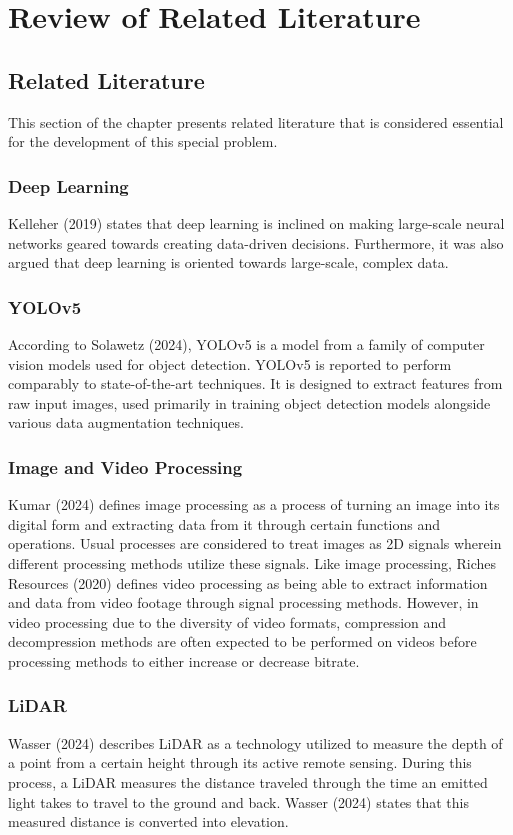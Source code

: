 \documentclass{report} %
\begin{document}
	
	\chapter{Review of Related Literature}
	
	\section{Related Literature}
	This section of the chapter presents related literature that is considered essential for the development of this special problem.
	
	\subsection{Deep Learning}
	Kelleher (2019) states that deep learning is inclined on making large-scale neural networks geared towards creating data-driven decisions. Furthermore, it was also argued that deep learning is oriented towards large-scale, complex data.
	
	\subsection{YOLOv5}
	According to Solawetz (2024), YOLOv5 is a model from a family of computer vision models used for object detection. YOLOv5 is reported to perform comparably to state-of-the-art techniques. It is designed to extract features from raw input images, used primarily in training object detection models alongside various data augmentation techniques.
	
	\subsection{Image and Video Processing}
	Kumar (2024) defines image processing as a process of turning an image into its digital form and extracting data from it through certain functions and operations. Usual processes are considered to treat images as 2D signals wherein different processing methods utilize these signals.
	Like image processing, Riches Resources (2020) defines video processing as being able to extract information and data from video footage through signal processing methods. However, in video processing due to the diversity of video formats, compression and decompression methods are often expected to be performed on videos before processing methods to either increase or decrease bitrate.
	
	\subsection{LiDAR}
	Wasser (2024) describes LiDAR as a technology utilized to measure the depth of a point from a certain height through its active remote sensing. During this process, a LiDAR measures the distance traveled through the time an emitted light takes to travel to the ground and back. Wasser (2024) states that this measured distance is converted into elevation.
	
\end{document}
